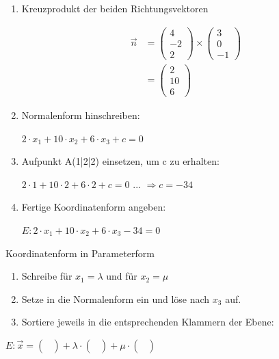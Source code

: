 \begin{antwort}\normalsize
	\begin{enumerate} 
		\item Kreuzprodukt der beiden Richtungsvektoren
		
		\begin{align*}
		\vec{n}&=\left(\begin{array}{c} 4 \\ -2 \\ 2\end{array} \right) \times \left(\begin{array}{c} 3 \\0 \\ -1\end{array} \right) \\
		&=\left(\begin{array}{c} 2 \\10 \\ 6\end{array} \right)
		\end{align*}
		
		\item Normalenform hinschreiben: 
		
		$2 \cdot x_1 + 10 \cdot x_2+6 \cdot x_3 + c = 0$
		
		\item Aufpunkt A(1|2|2) einsetzen, um c zu erhalten: 
		
		$2 \cdot 1 + 10 \cdot 2+6 \cdot 2 + c = 0$
		... $\Rightarrow c = -34$
		
		\item Fertige Koordinatenform angeben: 
		
		$E: 2 \cdot x_1 + 10 \cdot x_2+6 \cdot x_3  -34 = 0$
			
	\end{enumerate}\end{antwort}
\begin{frage}\LARGE
	Koordinatenform in Parameterform\end{frage}
\begin{antwort}\normalsize
	\begin{enumerate} 
		\item Schreibe für $x_1 = \lambda$ und für $x_2=\mu$	
		\item Setze in die Normalenform ein und löse nach $x_3$ auf.
		\item Sortiere jeweils in die entsprechenden Klammern der Ebene:			
	\end{enumerate} 
	$E:\vec{x}=\left(\begin{array}{c}  \\  \\ \end{array} \right)+\lambda \cdot \left(\begin{array}{c}  \\  \\ \end{array} \right)+\mu \cdot \left(\begin{array}{c}  \\ \\ \end{array} \right)$\end{antwort}

